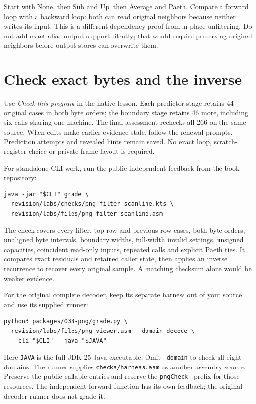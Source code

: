 Start with None, then Sub and Up, then Average and Paeth. Compare a forward
loop with a backward loop: both can read original neighbors because neither
writes its input. This is a different dependency proof from in-place unfiltering.
Do not add exact-alias output support silently; that would require preserving
original neighbors before output stores can overwrite them.

\section{Check exact bytes and the inverse}

Use \emph{Check this program} in the native lesson. Each predictor stage
retains 44 original cases in both byte orders; the boundary stage retains
46 more, including six calls sharing one machine. The final assessment rechecks
all 266 on the same source. When edits make earlier evidence stale, follow the
renewal prompts. Prediction attempts and revealed hints remain saved. No exact
loop, scratch-register choice or private frame layout is required.

For standalone CLI work, run the public independent feedback from the book repository:
\begin{Verbatim}
java -jar "$CLI" grade \
  revision/labs/checks/png-filter-scanline.kts \
  revision/labs/files/png-filter-scanline.asm
\end{Verbatim}
The check covers every filter, top-row and previous-row cases, both byte
orders, unaligned byte intervals, boundary widths, full-width invalid settings,
unsigned capacities, coincident read-only inputs, repeated calls and explicit
Paeth ties. It compares exact residuals and retained caller state, then applies
an inverse recurrence to recover every original sample. A matching checksum
alone would be weaker evidence.

For the original complete decoder, keep its separate harness out of your source
and use its supplied runner:
\Needspace{9\baselineskip}
\begin{Verbatim}
python3 packages/033-png/grade.py \
  revision/labs/files/png-viewer.asm --domain decode \
  --cli "$CLI" --java "$JAVA"
\end{Verbatim}
Here \texttt{JAVA} is the full JDK 25 Java executable. Omit \texttt{--domain}
to check all eight domains. The runner supplies \texttt{checks/harness.asm}
as another assembly source. Preserve the public callable entries and reserve
the \texttt{pngCheck\_} prefix for those resources. The independent forward
function has its own feedback; the original decoder runner does not grade it.

